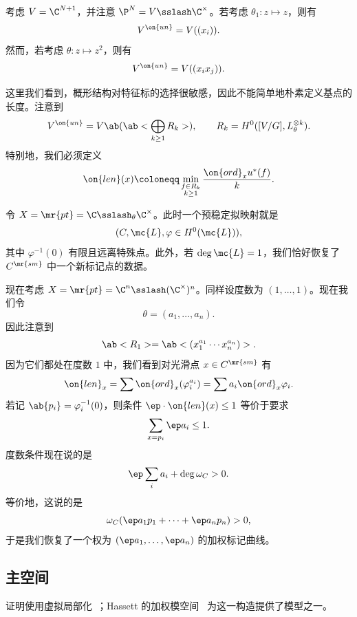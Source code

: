 \begin{exm}
    考虑 \(V = \C^{N+1}\)，并注意 \(\P^N = V \sslash \C^{\times}\)。若考虑 \(\theta_1 \colon z \mapsto z\)，则有 
    \[ V^{\on{un}} = V((x_i)). \]
    然而，若考虑 \(\theta \colon z \mapsto z^2\)，则有
    \[ V^{\on{un}} = V((x_i x_j)). \]
\end{exm}

这里我们看到，概形结构对特征标的选择很敏感，因此不能简单地朴素定义基点的长度。注意到
\[ V^{\on{un}} = V\ab(\ab< \bigoplus_{k \geq 1} R_k>), \qquad R_k = H^0([V/G], L_{\theta}^{\otimes k}). \]
特别地，我们必须定义
\[ \on{len}(x) \coloneqq \min_{\substack{f \in R_k \\ k \geq 1}} \frac{\on{ord}_x u^*(f)}{k}. \]

\begin{exm}
    令 \(X = \mr{pt} = \C \sslash_{\theta} \C^{\times}\)。此时一个预稳定拟映射就是
    \[ (C, \mc{L}, \varphi \in H^0(\mc{L})), \]
    其中 \(\varphi^{-1}(0)\) 有限且远离特殊点。此外，若 \(\deg \mc{L} = 1\)，我们恰好恢复了 \(C^{\mr{sm}}\) 中一个新标记点的数据。
\end{exm}

\begin{exm}
    现在考虑 \(X = \mr{pt} = \C^n \sslash (\C^{\times})^n\)。同样设度数为 \((1, \ldots, 1)\)。现在我们令
    \[ \theta = (a_1, \ldots, a_n). \]
    因此注意到
    \[ \ab<R_1> = \ab<(x_1^{a_1} \cdots x_n^{a_n})>. \]
    因为它们都处在度数 \(1\) 中，我们看到对光滑点 \(x \in C^{\mr{sm}}\) 有
    \[ \on{len}_x = \sum \on{ord}_x (\varphi_i^{a_i}) = \sum a_i \on{ord}_x \varphi_i. \]
    若记 \(\ab\{p_i\} = \varphi_i^{-1}(0)\)，则条件 \(\ep \cdot \on{len}(x) \leq 1\) 等价于要求 
    \[ \sum_{x = p_i} \ep a_i \leq 1. \]
    度数条件现在说的是
    \[ \ep \sum_i a_i + \deg \omega_C > 0. \]
    等价地，这说的是
    \[ \omega_C(\ep a_1 p_1 + \cdots + \ep a_n p_n) > 0, \]
    于是我们恢复了一个权为 \((\ep a_1, \ldots, \ep a_n)\) 的加权标记曲线。
\end{exm}

\subsection{主空间}%
\label{sub:Master space}

证明使用虚拟局部化~\cite{GP1999}；Hassett 的加权模空间~\cite{Hassett2003} 为这一构造提供了模型之一。

